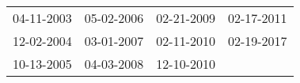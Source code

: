 \begin{supertabular}{llll}
 04-11-2003 &  05-02-2006 &  02-21-2009 &  02-17-2011 \\
 12-02-2004 &  03-01-2007 &  02-11-2010 &  02-19-2017 \\
 10-13-2005 &  04-03-2008 &  12-10-2010 &             \\
\end{supertabular}
